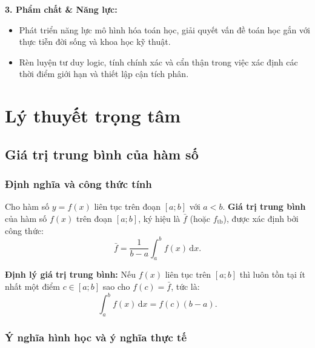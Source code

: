 \documentclass[12pt]{article}
\begin{document}
	\noindent \textbf{3. Phẩm chất \& Năng lực:}
	\begin{itemize}
		\item Phát triển năng lực mô hình hóa toán học, giải quyết vấn đề toán học gắn với thực tiễn đời sống và khoa học kỹ thuật.
		\item Rèn luyện tư duy logic, tính chính xác và cẩn thận trong việc xác định các thời điểm giới hạn và thiết lập cận tích phân.
	\end{itemize}
	
	\newpage
	
	\setcounter{tocdepth}{2}
	\tableofcontents
	\newpage
	
	\section{Lý thuyết trọng tâm}\label{sec:lythuyet}
	
	\subsection{Giá trị trung bình của hàm số}
	
	\subsubsection{Định nghĩa và công thức tính}
	
	\begin{tcolorbox}[colback=blue!3!white, colframe=blue!65!black, arc=2mm, title=\textbf{Định nghĩa Giá trị trung bình của hàm số}]
		Cho hàm số $y = f(x)$ liên tục trên đoạn $[a; b]$ với $a < b$. \textbf{Giá trị trung bình} của hàm số $f(x)$ trên đoạn $[a; b]$, ký hiệu là $\bar{f}$ (hoặc $f_{\text{tb}}$), được xác định bởi công thức:
		\[
		\bar{f} = \frac{1}{b - a} \int_a^b f(x)\,\mathrm{d}x.
		\]
	\end{tcolorbox}
	
	\noindent \textbf{Định lý giá trị trung bình:} Nếu $f(x)$ liên tục trên $[a; b]$ thì luôn tồn tại ít nhất một điểm $c \in [a; b]$ sao cho $f(c) = \bar{f}$, tức là:
	\[
	\int_a^b f(x)\,\mathrm{d}x = f(c)(b - a).
	\]
	
	\subsubsection{Ý nghĩa hình học và ý nghĩa thực tế}
	
\end{document}
